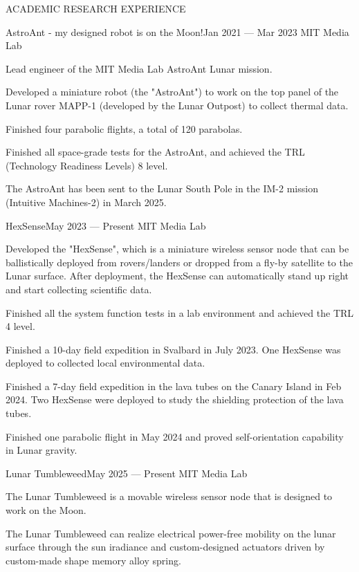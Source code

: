 \documentclass{resume} %
\begin{document}
\begin{rSection}{ACADEMIC RESEARCH EXPERIENCE}
\begin{rSubsection}{AstroAnt - my designed robot is on the Moon!}{Jan 2021 --- Mar 2023}{ }{MIT Media Lab}
    \item Lead engineer of the MIT Media Lab AstroAnt Lunar mission.
    \item Developed a miniature robot (the "AstroAnt") to work on the top panel of the Lunar rover MAPP-1 (developed by the Lunar Outpost)
          to collect thermal data.
    \item Finished four parabolic flights, a total of 120 parabolas.
    \item Finished all space-grade tests for the AstroAnt, and achieved the TRL (Technology Readiness Levels) 8 level.
    \item The AstroAnt has been sent to the Lunar South Pole in the IM-2 mission (Intuitive Machines-2) in March 2025.
\end{rSubsection}

\begin{rSubsection}{HexSense}{May 2023 --- Present}{ }{MIT Media Lab}
\item Developed the "HexSense", which is a miniature wireless sensor node that can be
ballistically deployed from rovers/landers or dropped from a fly-by satellite to the Lunar surface.
After deployment, the HexSense can automatically stand up right and start collecting scientific data.
\item Finished all the system function tests in a lab environment and achieved the TRL 4 level.
\item Finished a 10-day field expedition in Svalbard in July 2023.
One HexSense was deployed to collected local environmental data.
\item Finished a 7-day field expedition in the lava tubes on the Canary Island in Feb 2024.
Two HexSense were deployed to study the shielding protection of the lava tubes.
\item Finished one parabolic flight in May 2024 and proved self-orientation capability in Lunar gravity.
\end{rSubsection}

\begin{rSubsection}{Lunar Tumbleweed}{May 2025 --- Present}{ }{MIT Media Lab}
\item The Lunar Tumbleweed is a movable wireless sensor node that is designed to work on the Moon.
\item The Lunar Tumbleweed can realize electrical power-free mobility on the lunar surface through
the sun iradiance and custom-designed actuators driven by custom-made shape memory alloy spring.
\end{rSubsection}


\end{rSection}
\end{document}
